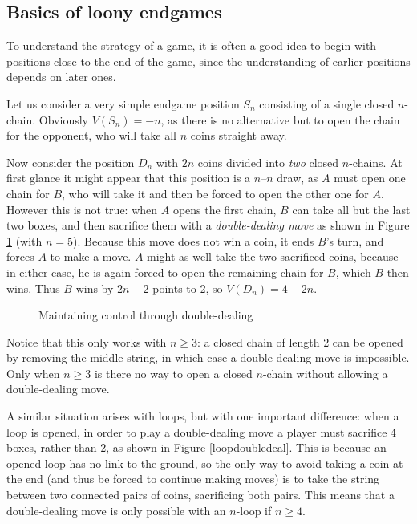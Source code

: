 \documentclass[a4paper,twocolumn]{article}
\begin{document}
\subsection{Basics of loony endgames}

To understand the strategy of a game, it is often a good idea to begin
with positions close to the end of the game, since the understanding
of earlier positions depends on later ones.

Let us consider a very simple endgame position $S_n$ consisting of a
single closed $n$-chain. Obviously $V(S_n)=-n$, as there is no
alternative but to open the chain for the opponent, who will take all
$n$ coins straight away.

Now consider the position $D_n$ with $2n$ coins divided into
\emph{two} closed $n$-chains. At first glance it might appear that
this position is a $n$--$n$ draw, as $A$ must open one chain for $B$,
who will take it and then be forced to open the other one for
$A$. However this is not true: when $A$ opens the first chain, $B$ can
take all but the last two boxes, and then sacrifice them with a
\emph{double-dealing move} as shown in Figure \ref{dddemo} (with
$n=5$). Because this move does not win a coin, it ends $B$'s turn, and
forces $A$ to make a move. $A$ might as well take the two sacrificed
coins, because in either case, he is again forced to open the
remaining chain for $B$, which $B$ then wins. Thus $B$ wins by $2n -
2$ points to 2, so $V(D_n) = 4-2n$.

\begin{figure}
  \centering
  \def\svgscale{0.7}
  
  \caption{Maintaining control through double-dealing}
  \label{dddemo}
\end{figure}

Notice that this only works with $n \ge 3$: a closed chain of length 2
can be opened by removing the middle string, in which case a
double-dealing move is impossible. Only when $n \ge 3$ is there no way
to open a closed $n$-chain without allowing a double-dealing move.

A similar situation arises with loops, but with one important
difference: when a loop is opened, in order to play a double-dealing
move a player must sacrifice 4 boxes, rather than 2, as shown in
Figure \ref{loopdoubledeal}. This is because an opened loop has no
link to the ground, so the only way to avoid taking a coin at the end
(and thus be forced to continue making moves) is to take the string
between two connected pairs of coins, sacrificing both pairs. This
means that a double-dealing move is only possible with an $n$-loop if
$n \ge 4$.
\end{document}
